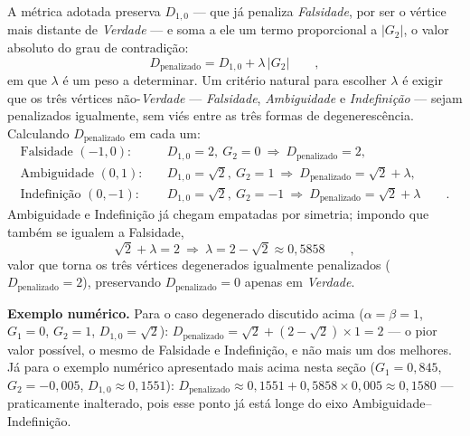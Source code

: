 				\par A métrica adotada preserva $D_{1,0}$ --- que já penaliza \textit{Falsidade}, por ser o vértice mais distante de \textit{Verdade} --- e soma a ele um termo proporcional a $|G_2|$, o valor absoluto do grau de contradição:
				\begin{equation}
					\label{eq:dpenalizado}
					D_{\text{penalizado}} = D_{1,0} + \lambda\,|G_2| \qquad,
				\end{equation}
				em que $\lambda$ é um peso a determinar. Um critério natural para escolher $\lambda$ é exigir que os três vértices não-\textit{Verdade} --- \textit{Falsidade}, \textit{Ambiguidade} e \textit{Indefinição} --- sejam penalizados igualmente, sem viés entre as três formas de degenerescência. Calculando $D_{\text{penalizado}}$ em cada um:
				\begin{equation*}
					\begin{aligned}
						\text{Falsidade } (-1,0): &\quad D_{1,0}=2,\ G_2=0 \ \Rightarrow\ D_{\text{penalizado}}=2, \\
						\text{Ambiguidade } (0,1): &\quad D_{1,0}=\sqrt2,\ G_2=1 \ \Rightarrow\ D_{\text{penalizado}}=\sqrt2+\lambda, \\
						\text{Indefinição } (0,-1): &\quad D_{1,0}=\sqrt2,\ G_2=-1 \ \Rightarrow\ D_{\text{penalizado}}=\sqrt2+\lambda \qquad.
					\end{aligned}
				\end{equation*}
				Ambiguidade e Indefinição já chegam empatadas por simetria; impondo que também se igualem a Falsidade,
				\begin{equation}
					\sqrt2+\lambda = 2 \ \Longrightarrow\ \lambda = 2-\sqrt2 \approx 0{,}5858 \qquad,
					\label{eq:lambdaPenalizado}
				\end{equation}
				valor que torna os três vértices degenerados igualmente penalizados ($D_{\text{penalizado}}=2$), preservando $D_{\text{penalizado}}=0$ apenas em \textit{Verdade}.

				\par \textbf{Exemplo numérico.} Para o caso degenerado discutido acima ($\alpha=\beta=1$, $G_1=0$, $G_2=1$, $D_{1,0}=\sqrt2$): $D_{\text{penalizado}} = \sqrt2 + (2-\sqrt2)\times1 = 2$ --- o pior valor possível, o mesmo de Falsidade e Indefinição, e não mais um dos melhores. Já para o exemplo numérico apresentado mais acima nesta seção ($G_1=0{,}845$, $G_2=-0{,}005$, $D_{1,0}\approx0{,}1551$): $D_{\text{penalizado}} \approx 0{,}1551 + 0{,}5858\times0{,}005 \approx 0{,}1580$ --- praticamente inalterado, pois esse ponto já está longe do eixo Ambiguidade--Indefinição.

